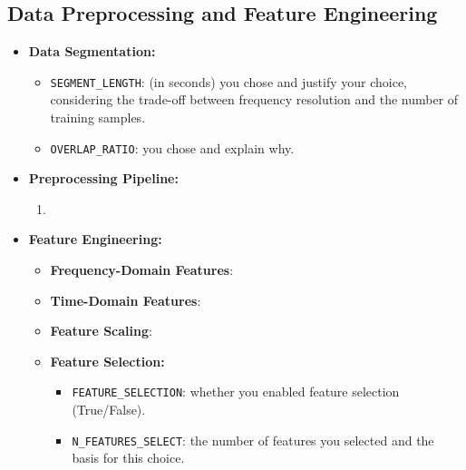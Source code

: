 \subsection{Data Preprocessing and Feature Engineering}
\begin{itemize}[leftmargin=*]
    \item \textbf{Data Segmentation:}
    \begin{itemize}
        \item \texttt{SEGMENT\_LENGTH}:  (in seconds) you chose and justify your choice, considering the trade-off between frequency resolution and the number of training samples.
        \item \texttt{OVERLAP\_RATIO}:  you chose and explain why.
    \end{itemize}

    \item \textbf{Preprocessing Pipeline:}
    \begin{enumerate}
        \item {}
    \end{enumerate}

    \item \textbf{Feature Engineering:}
    \begin{itemize}
        \item \textbf{Frequency-Domain Features}: 
        \item \textbf{Time-Domain Features}: 
        \item \textbf{Feature Scaling}: 
        \item \textbf{Feature Selection:}
        \begin{itemize}
            \item \texttt{FEATURE\_SELECTION}:  whether you enabled feature selection (True/False).
            \item \texttt{N\_FEATURES\_SELECT}:  the number of features you selected and the basis for this choice.
        \end{itemize}
    \end{itemize}
\end{itemize}

